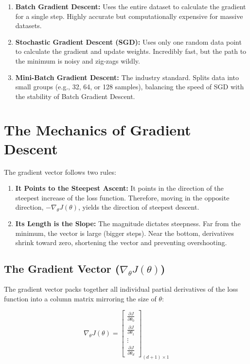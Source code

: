 \documentclass[12pt, a4paper]{report}
\begin{document}
\begin{enumerate}
    \item \textbf{Batch Gradient Descent:} Uses the entire dataset to calculate the gradient for a single step. Highly accurate but computationally expensive for massive datasets.
    \item \textbf{Stochastic Gradient Descent (SGD):} Uses only one random data point to calculate the gradient and update weights. Incredibly fast, but the path to the minimum is noisy and zig-zags wildly.
    \item \textbf{Mini-Batch Gradient Descent:} The industry standard. Splits data into small groups (e.g., 32, 64, or 128 samples), balancing the speed of SGD with the stability of Batch Gradient Descent.
\end{enumerate}

\section{The Mechanics of Gradient Descent}

The gradient vector follows two rules:
\begin{enumerate}
    \item \textbf{It Points to the Steepest Ascent:} It points in the direction of the steepest increase of the loss function. Therefore, moving in the opposite direction, $-\nabla_\theta J (\theta)$, yields the direction of steepest descent.
    \item \textbf{Its Length is the Slope:} The magnitude dictates steepness. Far from the minimum, the vector is large (bigger steps). Near the bottom, derivatives shrink toward zero, shortening the vector and preventing overshooting.
\end{enumerate}

\subsection{The Gradient Vector ($\nabla_\theta J(\theta)$)}

The gradient vector packs together all individual partial derivatives of the loss function into a column matrix mirroring the size of $\theta$:

\[
\nabla_\theta J(\theta) = \begin{bmatrix} \frac{\partial J}{\partial \theta_0} \\ \frac{\partial J}{\partial \theta_1} \\ \vdots \\ \frac{\partial J}{\partial \theta_d} \end{bmatrix}_{(d+1) \times 1}
\]
\end{document}
